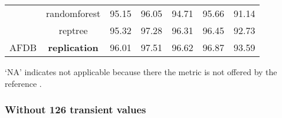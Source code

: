 \begin{table}[h]
\begin{center}
\begin{threeparttable}
\begin{tabular}{c c c c c c c}
  & randomforest & 95.15 & 96.05 & 94.71 & 95.66 & 91.14 \\
  & reptree & 95.32 & 97.28 & 96.31 & 96.45 & 92.73 \\
  \hline
  AFDB & \textbf{replication} & 96.01 & 97.51 & 96.62 & 96.87 & 93.59 \\
  \bottomrule
\end{tabular}
\begin{tablenotes}
 	\item ‘NA’ indicates not applicable because there the metric is not offered by the reference \cite{zhou2015}.
    \end{tablenotes}
\end{threeparttable}
\end{center}
\end{table}

\subsubsection{Without 126 transient values}
